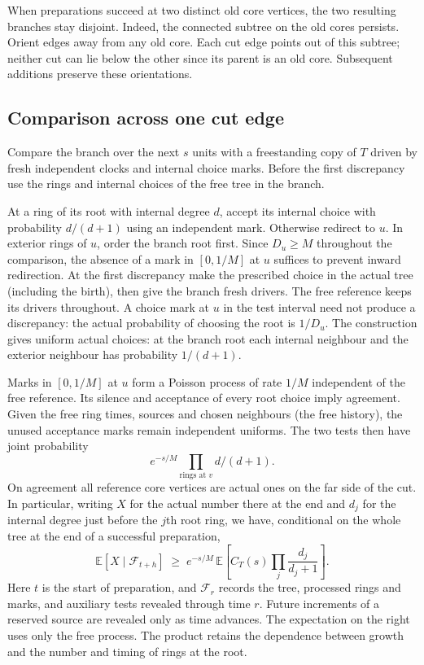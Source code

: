 \documentclass[11pt]{article}
\theoremstyle{remark}
\numberwithin{equation}{section}
\newcommand{\E}{\mathbb E}
\begin{document}
When preparations succeed at two distinct old core vertices, the two resulting branches stay disjoint. Indeed, the connected subtree on the old cores persists. Orient edges away from any old core. Each cut edge points out of this subtree; neither cut can lie below the other since its parent is an old core. Subsequent additions preserve these orientations.

\subsection{Comparison across one cut edge}
Compare the branch over the next $s$ units with a freestanding copy of $T$ driven by fresh independent clocks and internal choice marks. Before the first discrepancy use the rings and internal choices of the free tree in the branch.

At a ring of its root with internal degree $d$, accept its internal choice with probability $d/(d+1)$ using an independent mark. Otherwise redirect to $u$. In exterior rings of $u$, order the branch root first. Since $D_u\ge M$ throughout the comparison, the absence of a mark in $[0,1/M]$ at $u$ suffices to prevent inward redirection. At the first discrepancy make the prescribed choice in the actual tree (including the birth), then give the branch fresh drivers. The free reference keeps its drivers throughout. A choice mark at $u$ in the test interval need not produce a discrepancy: the actual probability of choosing the root is $1/D_u$. The construction gives uniform actual choices: at the branch root each internal neighbour and the exterior neighbour has probability $1/(d+1)$.

Marks in $[0,1/M]$ at $u$ form a Poisson process of rate $1/M$ independent of the free reference. Its silence and acceptance of every root choice imply agreement. Given the free ring times, sources and chosen neighbours (the free history), the unused acceptance marks remain independent uniforms. The two tests then have joint probability
\[
e^{-s/M}\prod_{\text{rings at }v}d/(d+1).
\]
On agreement all reference core vertices are actual ones on the far side of the cut. In particular, writing $X$ for the actual number there at the end and $d_j$ for the internal degree just before the $j$th root ring, we have, conditional on the whole tree at the end of a successful preparation,
\begin{equation}\label{eq:cut}
 \E[X\mid \mathcal F_{t+h}]
 \;\ge\; e^{-s/M}\,\E\!\left[C_T(s)\prod_j\frac{d_j}{d_j+1}\right].
\end{equation}
Here $t$ is the start of preparation, and $\mathcal F_r$ records the tree, processed rings and marks, and auxiliary tests revealed through time $r$. Future increments of a reserved source are revealed only as time advances. The expectation on the right uses only the free process. The product retains the dependence between growth and the number and timing of rings at the root.
\end{document}
